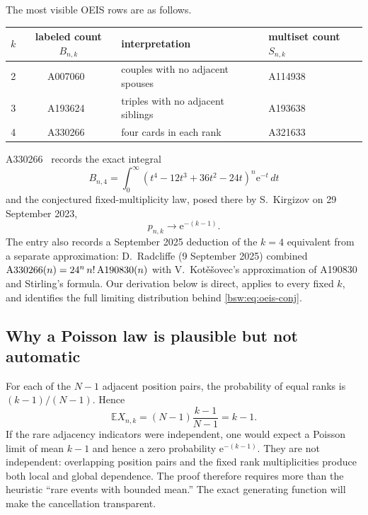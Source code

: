\documentclass[11pt,letterpaper]{article}
\theoremstyle{definition}
\theoremstyle{remark}
\newcommand{\EE}{\mathbb E}
\newcommand{\ee}{\mathrm e}
\begin{document}
The most visible OEIS rows are as follows.
\begin{center}
\begin{tabular}{ccll}
\toprule
$k$ & labeled count $B_{n,k}$ & interpretation & multiset count $S_{n,k}$\\
\midrule
2 & A007060~\cite{oeis007060} & couples with no adjacent spouses & A114938~\cite{oeis114938}\\
3 & A193624~\cite{oeis193624} & triples with no adjacent siblings & A193638~\cite{oeis193638}\\
4 & A330266~\cite{oeis330266} & four cards in each rank & A321633~\cite{oeis321633}\\
\bottomrule
\end{tabular}
\end{center}
A330266~\cite{oeis330266} records the exact integral
\[
 B_{n,4}=\int_0^\infty
 (t^4-12t^3+36t^2-24t)^n\ee^{-t}\,dt
\]
and the conjectured fixed-multiplicity law, posed there by S.~Kirgizov on
29 September 2023,
\begin{equation}\label{bsw:eq:oeis-conj}
 p_{n,k}\longrightarrow \ee^{-(k-1)}.
\end{equation}
The entry also records a September 2025 deduction of the $k=4$ equivalent
from a separate approximation: D.~Radcliffe (9 September 2025) combined
$\textnormal{A330266}(n)=24^n\,n!\,\textnormal{A190830}(n)$ with
V.~Kot\v{e}\v{s}ovec's approximation of A190830 and Stirling's formula.  Our derivation below is direct, applies to
every fixed $k$, and identifies the full limiting distribution behind
\eqref{bsw:eq:oeis-conj}.

\subsection{Why a Poisson law is plausible but not automatic}

For each of the $N-1$ adjacent position pairs, the probability of equal ranks
is $(k-1)/(N-1)$.  Hence
\begin{equation}\label{bsw:eq:mean-quick}
 \EE X_{n,k}=(N-1)\frac{k-1}{N-1}=k-1.
\end{equation}
If the rare adjacency indicators were independent, one would expect a
Poisson limit of mean $k-1$ and hence a zero probability $\ee^{-(k-1)}$.
They are not independent: overlapping position pairs and the fixed rank
multiplicities produce both local and global dependence.  The proof therefore
requires more than the heuristic ``rare events with bounded mean.''  The
exact generating function will make the cancellation transparent.
\end{document}
